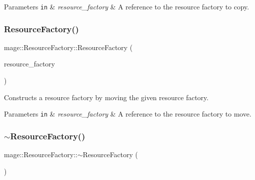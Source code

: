 \begin{DoxyParams}[1]{Parameters}
\mbox{\tt in}  & {\em resource\+\_\+factory} & A reference to the resource factory to copy. \\
\hline
\end{DoxyParams}
\hypertarget{classmage_1_1_resource_factory_a492a4d018530a7e5dcdb3f7a2800b252}{}\label{classmage_1_1_resource_factory_a492a4d018530a7e5dcdb3f7a2800b252} 
\subsubsection{\texorpdfstring{Resource\+Factory()}{ResourceFactory()}\hspace{0.1cm}{\footnotesize\ttfamily [3/3]}}
{\footnotesize\ttfamily mage\+::\+Resource\+Factory\+::\+Resource\+Factory (\begin{DoxyParamCaption}\item[{\hyperlink{classmage_1_1_resource_factory}{Resource\+Factory} \&\&}]{resource\+\_\+factory }\end{DoxyParamCaption})\hspace{0.3cm}{\ttfamily [default]}}

Constructs a resource factory by moving the given resource factory.


\begin{DoxyParams}[1]{Parameters}
\mbox{\tt in}  & {\em resource\+\_\+factory} & A reference to the resource factory to move. \\
\hline
\end{DoxyParams}
\hypertarget{classmage_1_1_resource_factory_a58764dea5d6cd05405bd62366cc25681}{}\label{classmage_1_1_resource_factory_a58764dea5d6cd05405bd62366cc25681} 
\subsubsection{\texorpdfstring{$\sim$\+Resource\+Factory()}{~ResourceFactory()}}
{\footnotesize\ttfamily mage\+::\+Resource\+Factory\+::$\sim$\+Resource\+Factory (\begin{DoxyParamCaption}{ }\end{DoxyParamCaption})\hspace{0.3cm}{\ttfamily [virtual]}}

